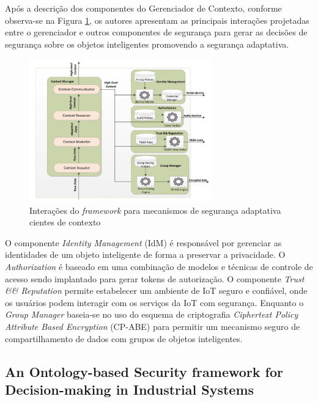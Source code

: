 \documentclass[tid,table]{texufpel} %
\begin{document}
Após a descrição dos componentes do Gerenciador de Contexto, conforme observa-se na Figura \ref{context-aware-adaptive-security}, os autores apresentam as principais interações projetadas entre o gerenciador e outros componentes de segurança para gerar as decisões de segurança sobre os objetos inteligentes promovendo a segurança adaptativa. 

 \begin{figure}[ht]
\centering
\includegraphics[width=0.7\textwidth]{imagens/context-aware-adaptive-security.png}
\caption{Interações do \textit{framework} para mecanismos de segurança adaptativa cientes de contexto}
\label{context-aware-adaptive-security}
\end{figure}

O componente \textit{Identity Management} (IdM) é responsável por gerenciar as identidades de um objeto inteligente de forma a preservar a privacidade. O \textit{Authorization} é baseado em uma combinação de modelos e técnicas de controle de acesso sendo implantado para gerar tokens de autorização. O componente \textit{Trust \&\& Reputation} permite estabelecer um ambiente de IoT seguro e confiável, onde os usuários podem interagir com os serviços da IoT com segurança. Enquanto o \textit{Group Manager} baseia-se no uso do esquema de criptografia \textit{Ciphertext Policy Attribute Based Encryption} (CP-ABE) para permitir um mecanismo seguro de compartilhamento de dados com grupos de objetos inteligentes.
 

\subsection{An Ontology-based Security framework for Decision-making in Industrial Systems} %
\end{document}
